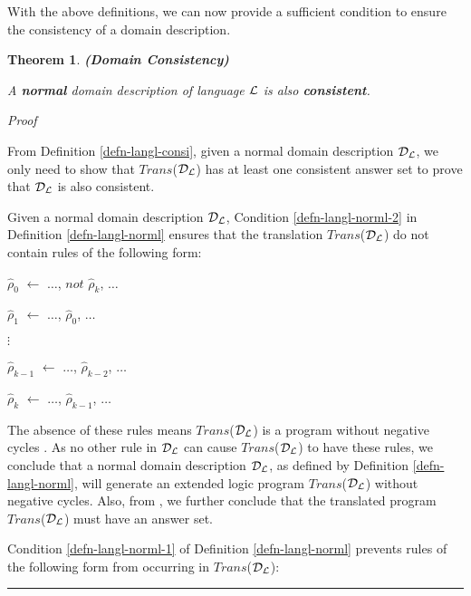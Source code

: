 \documentclass[11pt]{report}
\newtheorem{vvtheorem}{Theorem}[chapter]
\newenvironment{vtheorem}[1]
{
  \begin{vvtheorem}{{\bf (#1)}}
}
{
  \end{vvtheorem}
}
\newenvironment{vproof}
{
  \noindent
  {\em Proof}\hspace{0.5em}
}
{

  \noindent
  \rule{0.5em}{0.5em}
}
\newenvironment{vquote}
{
  \begin{list}{}{\leftmargin 1em}\item[]
}
{
  \end{list}
}
\begin{document}
      With the above definitions, we can now provide a sufficient condition to
      ensure the consistency of a domain description.

      \begin{vtheorem}{Domain Consistency}
        \label{theo-langl-consi}
        A {\bf normal} domain description of language ${\cal L}$ is also
        {\bf consistent}.
      \end{vtheorem}

      \begin{vproof}
        From Definition \ref{defn-langl-consi}, given a normal domain
        description ${\cal D}_{\cal L}$, we only need to show that
        $Trans$(${\cal D}_{\cal L}$) has at least one consistent answer set to
        prove that ${\cal D}_{\cal L}$ is also consistent.

        Given a normal domain description ${\cal D}_{\cal L}$, Condition
        \ref{defn-langl-norml-2} in Definition \ref{defn-langl-norml} ensures
        that the translation $Trans$(${\cal D}_{\cal L}$) do not contain rules
        of the following form:

        \begin{vquote}
          $\hat{\rho}_{0}$ $\leftarrow$
            $\hdots$, $not$ $\hat{\rho}_{k}$, $\hdots$

          $\hat{\rho}_{1}$ $\leftarrow$
            $\hdots$, $\hat{\rho}_{0}$, $\hdots$

          $\vdots$

          $\hat{\rho}_{k - 1}$ $\leftarrow$
            $\hdots$, $\hat{\rho}_{k - 2}$, $\hdots$

          $\hat{\rho}_{k}$ $\leftarrow$
            $\hdots$, $\hat{\rho}_{k - 1}$, $\hdots$
        \end{vquote}

        \noindent
        The absence of these rules means $Trans$(${\cal D}_{\cal L}$) is a
        program without negative cycles \cite{LIN}. As no other rule in
        ${\cal D}_{\cal L}$ can cause $Trans$(${\cal D}_{\cal L}$) to have
        these rules, we conclude that a normal domain description
        ${\cal D}_{\cal L}$, as defined by Definition \ref{defn-langl-norml},
        will generate an extended logic program $Trans$(${\cal D}_{\cal L}$)
        without negative cycles. Also, from \cite{BAR,LIN}, we further
        conclude that the translated program $Trans$(${\cal D}_{\cal L}$)
        must have an answer set.

        Condition \ref{defn-langl-norml-1} of Definition \ref{defn-langl-norml}
        prevents rules of the following form from occurring in
        $Trans$(${\cal D}_{\cal L}$):


\end{vproof}
\end{document}
